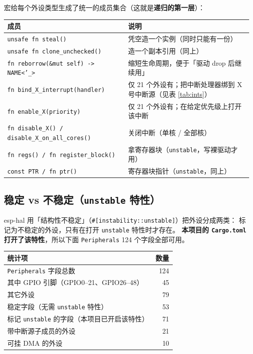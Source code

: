 \documentclass[UTF8,a4paper,11pt,fontset=fandol]{ctexart}
\newcommand{\fld}[1]{\texttt{#1}}
\newcommand{\tblhead}[1]{\textbf{#1}}
\begin{document}
宏给每个外设类型生成了统一的成员集合（这就是\textbf{递归的第一层}）：

\begin{center}
\small
\begin{tabular}{@{}p{4.6cm}p{10.6cm}@{}}
\toprule
成员 & 说明 \\
\midrule
\fld{unsafe fn steal()} & 凭空造一个实例（同时只能有一份）\\
\fld{unsafe fn clone\_unchecked()} & 造一个副本引用（同上）\\
\fld{fn reborrow(\&mut self) -> NAME<'\_>} & 缩短生命周期，便于「驱动 drop 后继续用」\\
\fld{fn bind\_X\_interrupt(handler)} & 仅 21 个外设有；把中断处理器绑到 X 号中断源（见表 \ref{tab:ints}）\\
\fld{fn enable\_X(priority)} & 仅 21 个外设有；在给定优先级上打开该中断\\
\fld{fn disable\_X() / disable\_X\_on\_all\_cores()} & 关闭中断（单核 / 全部核）\\
\fld{fn regs() / fn register\_block()} & 拿寄存器块（\texttt{unstable}，写裸驱动才用）\\
\fld{const PTR / fn ptr()} & 寄存器块指针（\texttt{unstable}，同上）\\
\bottomrule
\end{tabular}
\end{center}

\subsection{稳定 vs 不稳定（\texttt{unstable} 特性）}

esp-hal 用「结构性不稳定」（\fld{\#[instability::unstable]}）把外设分成两类：
标记为不稳定的外设，只有在打开 \fld{unstable} 特性时才存在。
\textbf{本项目的 \fld{Cargo.toml} 打开了该特性}，所以下面 \fld{Peripherals} 124 个字段全部可用。

\begin{center}
\small
\begin{tabular}{@{}lr@{}}
\toprule
\tblhead{统计项} & \tblhead{数量} \\
\midrule
\fld{Peripherals} 字段总数 & 124 \\
其中 GPIO 引脚（GPIO0--21、GPIO26--48） & 45 \\
其它外设 & 79 \\
稳定字段（无需 \texttt{unstable} 特性） & 53 \\
标记 \texttt{unstable} 的字段（本项目已开启该特性） & 71 \\
带中断源子成员的外设 & 21 \\
可挂 DMA 的外设 & 10 \\
\bottomrule
\end{tabular}
\end{center}
\end{document}
